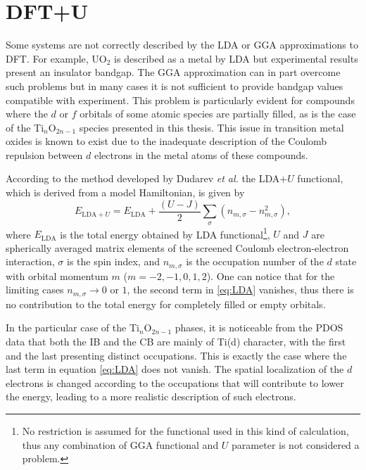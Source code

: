 \section{DFT+U}
\label{sec:app-dftu}

Some systems are not correctly described by the LDA or GGA approximations to DFT. For example, UO$_2$ is described as a metal by LDA but experimental results present an insulator bandgap. The GGA approximation can in part overcome such problems but in many cases it is not sufficient to provide bandgap values compatible with experiment. This problem is particularly evident for compounds where the $d$ or $f$ orbitals of some atomic species are partially filled, as is the case of the Ti$_n$O$_{2n-1}$ species presented in this thesis. This issue in transition metal oxides is known to exist due to the inadequate description of the Coulomb repulsion between $d$ electrons in the metal atoms of these compounds.

According to the method developed by Dudarev \textit{et al.} \cite{Dudarev1998} the LDA$+U$ functional, which is derived from a model Hamiltonian, is given by
\begin{equation}
 E_{\text{LDA}+U}=E_{\text{LDA}}+\frac{(U-J)}{2}\sum_{\sigma}(n_{m,\sigma}-n_{m,\sigma}^2),
 \label{eq:LDA}
\end{equation}
where $E_{\text{LDA}}$ is the total energy obtained by LDA functional\footnote{No restriction is assumed for the functional used in this kind of calculation, thus any combination of GGA functional and $U$ parameter is not considered a problem.}, $U$ and $J$ are spherically averaged matrix elements of the screened Coulomb electron-electron interaction, $\sigma$ is the spin index, and $n_{m,\sigma}$ is the occupation number of the $d$ state with orbital momentum $m$ ($m = -2, -1, 0, 1, 2$). One can notice that for the limiting cases $n_{m,\sigma}\rightarrow 0$ or $1$, the second term in \ref{eq:LDA} vanishes, thus there is no contribution to the total energy for completely filled or empty orbitals. 

In the particular case of the Ti$_n$O$_{2n-1}$ phases, it is noticeable from the PDOS data that both the IB and the CB are mainly of Ti(d) character, with the first and the last presenting distinct occupations. This is exactly the case where the last term in equation \ref{eq:LDA} does not vanish. The spatial localization of the $d$ electrons is changed according to the occupations that will contribute to lower the energy, leading to a more realistic description of such electrons.

